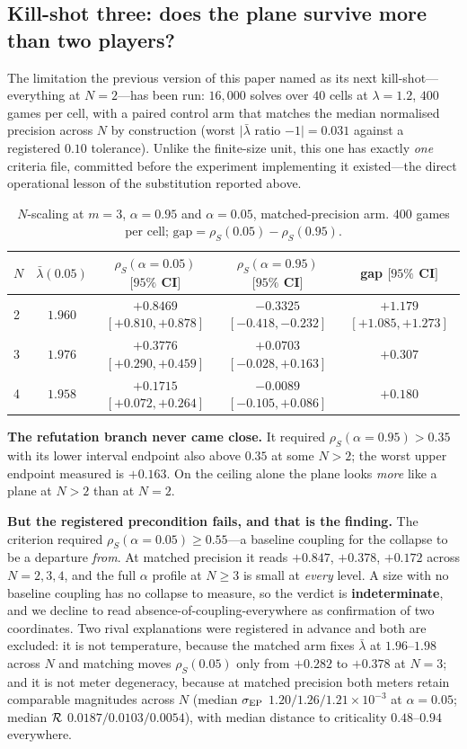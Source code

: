 \subsection{Kill-shot three: does the plane survive more than two players?}
\label{sec:nplayers}
The limitation the previous version of this paper named as its next kill-shot---everything
at $N=2$---has been run: $16{,}000$ solves over $40$ cells at $\lambda=1.2$, $400$ games
per cell, with a paired control arm that matches the median normalised precision across $N$
by construction (worst $|\bar\lambda$ ratio $-1| = 0.031$ against a registered $0.10$
tolerance). Unlike the finite-size unit, this one has exactly \emph{one} criteria file,
committed before the experiment implementing it existed---the direct operational lesson of
the substitution reported above.

\begin{table}[H]
\caption{$N$-scaling at $m=3$, $\alpha=0.95$ and $\alpha=0.05$, matched-precision arm.
$400$ games per cell; $\mathrm{gap}=\rho_S(0.05)-\rho_S(0.95)$.}
\label{tab:nplayers}
\small
\begin{tabular}{lcccc}
\toprule
$N$ & $\bar\lambda(0.05)$ & $\rho_S(\alpha{=}0.05)$ $[95\%$ CI$]$ & $\rho_S(\alpha{=}0.95)$ $[95\%$ CI$]$ & gap $[95\%$ CI$]$ \\
\midrule
2 & $1.960$ & $+0.8469$ $[+0.810,+0.878]$ & $-0.3325$ $[-0.418,-0.232]$ & $+1.179$ $[+1.085,+1.273]$ \\
3 & $1.976$ & $+0.3776$ $[+0.290,+0.459]$ & $+0.0703$ $[-0.028,+0.163]$ & $+0.307$ \\
4 & $1.958$ & $+0.1715$ $[+0.072,+0.264]$ & $-0.0089$ $[-0.105,+0.086]$ & $+0.180$ \\
\bottomrule
\end{tabular}
\end{table}

\noindent\textbf{The refutation branch never came close.} It required
$\rho_S(\alpha{=}0.95)>0.35$ with its lower interval endpoint also above $0.35$ at some
$N>2$; the worst upper endpoint measured is $+0.163$. On the ceiling alone the plane looks
\emph{more} like a plane at $N>2$ than at $N=2$.

\noindent\textbf{But the registered precondition fails, and that is the finding.} The
criterion required $\rho_S(\alpha{=}0.05)\ge0.55$---a baseline coupling for the collapse to
be a departure \emph{from}. At matched precision it reads $+0.847$, $+0.378$, $+0.172$
across $N=2,3,4$, and the full $\alpha$ profile at $N\ge3$ is small at \emph{every} level.
A size with no baseline coupling has no collapse to measure, so the verdict is
\textbf{indeterminate}, and we decline to read absence-of-coupling-everywhere as
confirmation of two coordinates. Two rival explanations were registered in advance and both
are excluded: it is not temperature, because the matched arm fixes $\bar\lambda$ at
$1.96$--$1.98$ across $N$ and matching moves $\rho_S(0.05)$ only from $+0.282$ to $+0.378$
at $N=3$; and it is not meter degeneracy, because at matched precision both meters retain
comparable magnitudes across $N$ (median $\sigma_{\mathrm{EP}}$ $1.20/1.26/1.21\times10^{-3}$ at
$\alpha=0.05$; median $\mathcal{R}$ $0.0187/0.0103/0.0054$), with median distance to criticality
$0.48$--$0.94$ everywhere.

